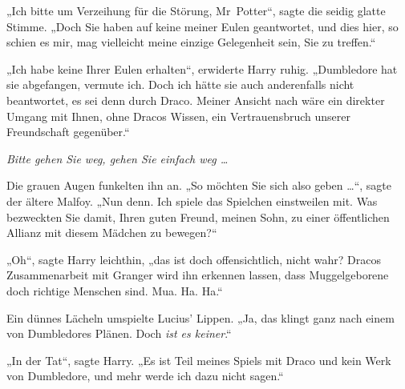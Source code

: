 „Ich bitte um Verzeihung für die Störung, Mr~Potter“, sagte die seidig glatte Stimme.
„Doch Sie haben auf keine meiner Eulen geantwortet, und dies hier, so schien es mir, mag vielleicht meine einzige Gelegenheit sein, Sie zu treffen.“

„Ich habe keine Ihrer Eulen erhalten“, erwiderte Harry ruhig.
„Dumbledore hat sie abgefangen, vermute ich. Doch ich hätte sie auch anderenfalls nicht beantwortet, es sei denn durch Draco. Meiner Ansicht nach wäre ein direkter Umgang mit Ihnen, ohne Dracos Wissen, ein Vertrauensbruch unserer Freundschaft gegenüber.“

\emph{Bitte gehen Sie weg, gehen Sie einfach weg …}

Die grauen Augen funkelten ihn an.
„So möchten Sie sich also geben …“, sagte der ältere Malfoy.
„Nun denn. Ich spiele das Spielchen einstweilen mit. Was bezweckten Sie damit, Ihren guten Freund, meinen Sohn, zu einer öffentlichen Allianz mit diesem Mädchen zu bewegen?“

„Oh“, sagte Harry leichthin, „das ist doch offensichtlich, nicht wahr? Dracos Zusammenarbeit mit Granger wird ihn erkennen lassen, dass Muggelgeborene doch richtige Menschen sind. Mua. Ha. Ha.“

Ein dünnes Lächeln umspielte Lucius’ Lippen.
„Ja, das klingt ganz nach einem von Dumbledores Plänen. Doch \emph{ist es keiner}.“

„In der Tat“, sagte Harry.
„Es ist Teil meines Spiels mit Draco und kein Werk von Dumbledore, und mehr werde ich dazu nicht sagen.“

